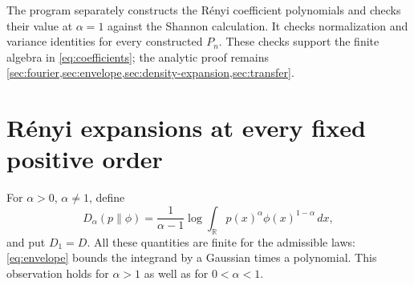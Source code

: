 \documentclass[11pt,a4paper]{article}
\numberwithin{equation}{section}
\theoremstyle{definition}
\theoremstyle{remark}
\newcommand{\R}{\mathbb R}
\newcommand{\dd}{\,dx}
\begin{document}
The program separately constructs the R\'enyi coefficient polynomials and
checks their value at $\alpha=1$ against the Shannon calculation. It checks
normalization and variance identities for every constructed $P_n$. These
checks support the finite algebra in \eqref{eq:coefficients}; the analytic
proof remains \cref{sec:fourier,sec:envelope,sec:density-expansion,sec:transfer}.

\section{R\'enyi expansions at every fixed positive order}
\label{sec:renyi}

For $\alpha>0$, $\alpha\ne1$, define
\begin{equation}
 D_\alpha(p\|\phi)=\frac1{\alpha-1}
  \log\int_{\R}p(x)^\alpha\phi(x)^{1-\alpha}\dd,
 \label{eq:renyi}
\end{equation}
and put $D_1=D$. All these quantities are finite for the admissible laws:
\eqref{eq:envelope} bounds the integrand by a Gaussian times a polynomial.
This observation holds for $\alpha>1$ as well as for $0<\alpha<1$.
\end{document}
